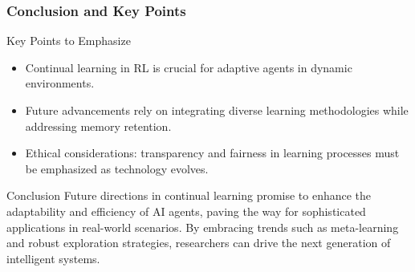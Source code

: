 \documentclass[aspectratio=169]{beamer}
\begin{document}
\begin{frame}[fragile]
    \frametitle{Conclusion and Key Points}
    \begin{block}{Key Points to Emphasize}
        \begin{itemize}
            \item Continual learning in RL is crucial for adaptive agents in dynamic environments.
            \item Future advancements rely on integrating diverse learning methodologies while addressing memory retention.
            \item Ethical considerations: transparency and fairness in learning processes must be emphasized as technology evolves.
        \end{itemize}
    \end{block}

    \begin{block}{Conclusion}
        Future directions in continual learning promise to enhance the adaptability and efficiency of AI agents, paving the way for sophisticated applications in real-world scenarios. By embracing trends such as meta-learning and robust exploration strategies, researchers can drive the next generation of intelligent systems.
    \end{block}
\end{frame}
\end{document}
